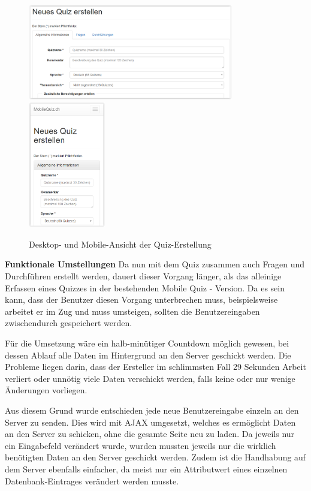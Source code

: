 \begin{figure}[H]
	\centering
	\includegraphics[width=0.8\textwidth]{Images/Quiz_Erstellen1.PNG}
	\includegraphics[width=0.3\textwidth]{Images/Quiz_Erstellen_Mobile.PNG}
	\caption{Desktop- und Mobile-Ansicht der Quiz-Erstellung}
\end{figure}


\textbf{Funktionale Umstellungen}
Da nun mit dem Quiz zusammen auch Fragen und Durchführen erstellt werden, dauert dieser Vorgang länger, als das alleinige Erfassen eines Quizzes in der bestehenden Mobile Quiz - Version. Da es sein kann, dass der Benutzer diesen Vorgang unterbrechen muss, beispielsweise arbeitet er im Zug und muss umsteigen, sollten die Benutzereingaben zwischendurch gespeichert werden.

Für die Umsetzung wäre ein halb-minütiger Countdown möglich gewesen, bei dessen Ablauf alle Daten im Hintergrund an den Server geschickt werden. Die Probleme liegen darin, dass der Ersteller im schlimmsten Fall 29 Sekunden Arbeit verliert oder unnötig viele Daten verschickt werden, falls keine oder nur wenige Änderungen vorliegen.

Aus diesem Grund wurde entschieden jede neue Benutzereingabe einzeln an den Server zu senden. Dies wird mit \acrfull{AJAX} umgesetzt, welches es ermöglicht Daten an den Server zu schicken, ohne die gesamte Seite neu zu laden. Da jeweils nur ein Eingabefeld verändert wurde, wurden mussten jeweils nur die wirklich benötigten Daten an den Server geschickt werden. Zudem ist die Handhabung auf dem Server ebenfalls einfacher, da meist nur ein Attributwert eines einzelnen Datenbank-Eintrages verändert werden musste.


